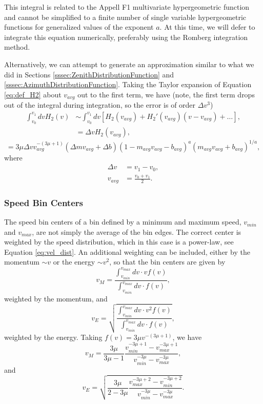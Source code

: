 \documentclass{hitec}
\numberwithin{equation}{section}
\begin{document}
This integral is related to the Appell F1 multivariate hypergeometric function and cannot be simplified to a finite number of single variable hypergeometric functions for generalized values of the exponent $a$. At this time, we will defer to integrate this equation numerically, preferably using the Romberg integration method.

Alternatively, we can attempt to generate an approximation similar to what we did in Sections \ref{sssec:ZenithDistributionFunction} and \ref{sssec:AzimuthDistributionFunction}. Taking the Taylor expansion of Equation \eqref{eq:def_H2} about $v_{avg}$ out to the first term, we have (note, the first term drops out of the integral during integration, so the error is of order $\Delta v^3$)
\begin{align}
\int_{v_0}^{v_1}dv H_2(v) &\sim \int_{v_0}^{v_1}dv[H_2(v_{avg}) + H_2'(v_{avg})(v-v_{avg})+\dots],\\
&= \Delta v H_2(v_{avg}),\nonumber
\end{align}
\begin{equation}
=3\mu\Delta v v_{avg}^{-(3\mu+1)}(\Delta m v_{avg} + \Delta b)(1-m_{avg}v_{avg}-b_{avg})^a(m_{avg}v_{avg} + b_{avg})^{1/a},
\end{equation}
where
\begin{align}
\Delta v &= v_1-v_0,\\
v_{avg} &= \frac{v_0 + v_1}{2}.
\end{align}


\subsubsection{Speed Bin Centers}
The speed bin centers of a bin defined by a minimum and maximum speed, $v_{min}$ and $v_{max}$, are not simply the average of the bin edges. The correct center is weighted by the speed distribution, which in this case is a power-law, see Equation \eqref{eq:vel_dist}. An additional weighting can be included, either by the momentum $\sim v$ or the energy $\sim v^2$, so that the bin centers are given by
\begin{equation}
v_M = \frac{\int_{v_{min}}^{v_{max}}dv\cdot vf(v)}{\int_{v_{min}}^{v_{max}}dv\cdot f(v)},
\end{equation}
weighted by the momentum, and
\begin{equation}
v_E = \sqrt{\frac{\int_{v_{min}}^{v_{max}}dv\cdot v^2f(v)}{\int_{v_{min}}^{v_{max}}dv\cdot f(v)}},
\end{equation}
weighted by the energy. Taking $f(v) = 3\mu v^{-(3\mu+1)}$, we have
\begin{equation}
v_M = \frac{3\mu}{3\mu-1}\frac{v_{min}^{-3\mu+1}-v_{max}^{-3\mu+1}}{v_{min}^{-3\mu}-v_{max}^{-3\mu}},
\end{equation}
and
\begin{equation}
v_E = \sqrt{\frac{3\mu}{2-3\mu}\frac{v_{max}^{-3\mu+2}-v_{min}^{-3\mu+2}}{v_{min}^{-3\mu}-v_{max}^{-3\mu}}}.
\end{equation}
\end{document}
